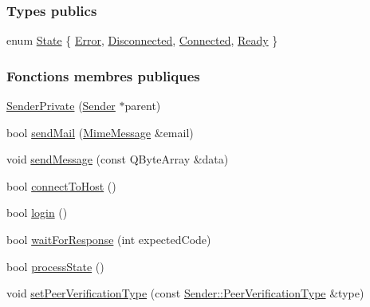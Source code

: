 \subsubsection*{Types publics}
\begin{DoxyCompactItemize}
\item 
enum \hyperlink{class_simple_mail_1_1_sender_private_ae09befddf0fae8e8f2ea153ead2b8b0a}{State} \{ \hyperlink{class_simple_mail_1_1_sender_private_ae09befddf0fae8e8f2ea153ead2b8b0aa86a2d9c3162cdacedf7c8948d2d99fe4}{Error}, 
\hyperlink{class_simple_mail_1_1_sender_private_ae09befddf0fae8e8f2ea153ead2b8b0aa53bd8486efb3caf4d88b5e4962182b5a}{Disconnected}, 
\hyperlink{class_simple_mail_1_1_sender_private_ae09befddf0fae8e8f2ea153ead2b8b0aa81776327acf2e160bb969693bdc4bc3b}{Connected}, 
\hyperlink{class_simple_mail_1_1_sender_private_ae09befddf0fae8e8f2ea153ead2b8b0aac1f1f30c7c54375f9bed9a95bd082416}{Ready}
 \}
\end{DoxyCompactItemize}
\subsubsection*{Fonctions membres publiques}
\begin{DoxyCompactItemize}
\item 
\hyperlink{class_simple_mail_1_1_sender_private_a97a8f31b0268f9cab7ee4552e251a2c8}{Sender\+Private} (\hyperlink{class_simple_mail_1_1_sender}{Sender} $\ast$parent)
\item 
bool \hyperlink{class_simple_mail_1_1_sender_private_a2ede5284746e77ee37b8fe96f4bbb100}{send\+Mail} (\hyperlink{class_simple_mail_1_1_mime_message}{Mime\+Message} \&email)
\item 
void \hyperlink{class_simple_mail_1_1_sender_private_a01805bb24291bf6cad3a656a16d0bb25}{send\+Message} (const Q\+Byte\+Array \&data)
\item 
bool \hyperlink{class_simple_mail_1_1_sender_private_aa2f9a37cfe58c3e39afa75e79070cee1}{connect\+To\+Host} ()
\item 
bool \hyperlink{class_simple_mail_1_1_sender_private_a927e5c262ee89fb335410ebec020091d}{login} ()
\item 
bool \hyperlink{class_simple_mail_1_1_sender_private_af8ba23dc3e1201d303ad1d923235c71c}{wait\+For\+Response} (int expected\+Code)
\item 
bool \hyperlink{class_simple_mail_1_1_sender_private_ab3a7663dd6945ce2ba074d37cfc4e4ec}{process\+State} ()
\item 
void \hyperlink{class_simple_mail_1_1_sender_private_aea040b22ce411e03111080e7546f91c0}{set\+Peer\+Verification\+Type} (const \hyperlink{class_simple_mail_1_1_sender_acfbcf388ab7c26cd41c5c77601fe8804}{Sender\+::\+Peer\+Verification\+Type} \&type)
\end{DoxyCompactItemize}
